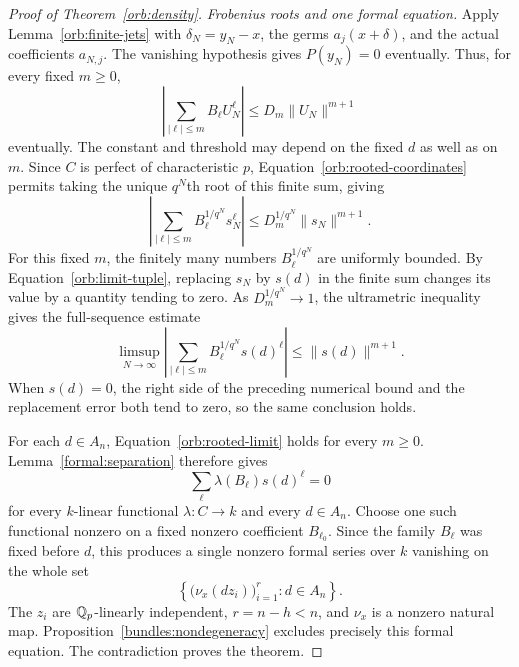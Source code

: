 \begin{proof}[Proof of Theorem~\ref{orb:density}]
\smallskip
\noindent\emph{Frobenius roots and one formal equation.}
Apply Lemma~\ref{orb:finite-jets} with
$\delta_N=y_N-x$, the germs $a_j(x+\delta)$, and the actual
coefficients $a_{N,j}$.  The vanishing hypothesis gives
$P(y_N)=0$ eventually.  Thus, for every fixed $m\geq0$,
\[
 \left|\sum_{|\ell|\leq m}B_\ell U_N^\ell\right|
 \leq D_m\|U_N\|^{m+1}
\]
eventually.  The constant and threshold may depend on the fixed $d$
as well as on $m$.  Since $C$ is perfect of characteristic $p$,
Equation~\eqref{orb:rooted-coordinates} permits taking the unique
$q^N$th root of this finite sum, giving
\[
 \left|\sum_{|\ell|\leq m}B_\ell^{1/q^N}s_N^\ell\right|
 \leq D_m^{1/q^N}\|s_N\|^{m+1}.
\]
For this fixed $m$, the finitely many numbers
$B_\ell^{1/q^N}$ are uniformly bounded.  By
Equation~\eqref{orb:limit-tuple}, replacing $s_N$ by $s(d)$ in the
finite sum changes its value by a quantity tending to zero.
As $D_m^{1/q^N}\to1$, the ultrametric inequality gives the
full-sequence estimate
\begin{equation}\label{orb:rooted-limit}
 \limsup_{N\to\infty}
 \left|\sum_{|\ell|\leq m}B_\ell^{1/q^N}s(d)^\ell\right|
 \leq\|s(d)\|^{m+1}.
\end{equation}
When $s(d)=0$, the right side of the preceding numerical bound and
the replacement error both tend to zero, so the same conclusion
holds.

For each $d\in A_n$, Equation~\eqref{orb:rooted-limit} holds for every
$m\geq0$.  Lemma~\ref{formal:separation} therefore gives
\[
 \sum_\ell\lambda(B_\ell)s(d)^\ell=0
\]
for every $k$-linear functional $\lambda:C\to k$ and every $d\in A_n$.
Choose one such functional nonzero on a fixed nonzero coefficient
$B_{\ell_0}$.  Since the family $B_\ell$ was fixed before $d$, this
produces a single nonzero formal series over $k$ vanishing on the whole
set
\[
 \left\{\bigl(\nu_x(dz_i)\bigr)_{i=1}^r:d\in A_n\right\}.
\]
The $z_i$ are $\mathbb Q_p$-linearly independent, $r=n-h<n$, and $\nu_x$ is
a nonzero natural map.  Proposition~\ref{bundles:nondegeneracy}
excludes precisely this formal equation.  The contradiction proves
the theorem.
\end{proof}
